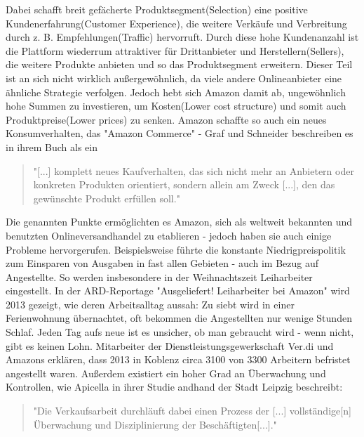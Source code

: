 Dabei schafft breit gefächerte Produktsegment(Selection) eine positive Kundenerfahrung(Customer Experience), die weitere Verkäufe und Verbreitung durch z. B. Empfehlungen(Traffic) hervorruft. Durch diese hohe Kundenanzahl ist die Plattform wiederrum attraktiver für Drittanbieter und Herstellern(Sellers), die weitere Produkte anbieten und so das Produktsegment erweitern. Dieser Teil ist an sich nicht wirklich außergewöhnlich, da viele andere Onlineanbieter eine ähnliche Strategie verfolgen. Jedoch hebt sich Amazon damit ab, ungewöhnlich hohe Summen zu investieren, um Kosten(Lower cost structure) und somit auch Produktpreise(Lower prices) zu senken\cite[S. 26f]{Graf}. Amazon schaffte so auch ein neues Konsumverhalten, das "Amazon Commerce" - Graf und Schneider beschreiben es in ihrem Buch als ein

\begin{quote}
    "[...] komplett neues Kaufverhalten, das sich nicht mehr an Anbietern oder konkreten Produkten orientiert, sondern allein am Zweck [...], den das gewünschte Produkt erfüllen soll."\cite[S. 42]{Graf}
\end{quote}

Die genannten Punkte ermöglichten es Amazon, sich als weltweit bekannten und benutzten Onlineversandhandel zu etablieren - jedoch haben sie auch einige Probleme hervorgerufen. Beispielsweise führte die konstante Niedrigpreispolitik\cite[Abb. 5]{Desjardins} zum Einsparen von Ausgaben in fast allen Gebieten - auch im Bezug auf Angestellte\cite[S. 6]{Apicella}. So werden insbesondere in der Weihnachtszeit Leiharbeiter eingestellt. In der ARD-Reportage "Ausgeliefert! Leiharbeiter bei Amazon" wird 2013 gezeigt, wie deren Arbeitsalltag aussah: Zu siebt wird in einer Ferienwohnung übernachtet, oft bekommen die Angestellten nur wenige Stunden Schlaf. Jeden Tag aufs neue ist es unsicher, ob man gebraucht wird - wenn nicht, gibt es keinen Lohn. Mitarbeiter der Dienstleistungsgewerkschaft Ver.di und Amazons erklären, dass 2013 in Koblenz circa 3100 von 3300 Arbeitern befristet angestellt waren\cite{Ausgeliefert}.
Außerdem existiert ein hoher Grad an Überwachung und Kontrollen, wie Apicella in ihrer Studie andhand der Stadt Leipzig beschreibt:

\begin{quote}
    "Die Verkaufsarbeit durchläuft dabei einen Prozess der [...] vollständige[n] Überwachung und Disziplinierung der Beschäftigten[...].\cite[S. 29]{Apicella}"
\end{quote}

